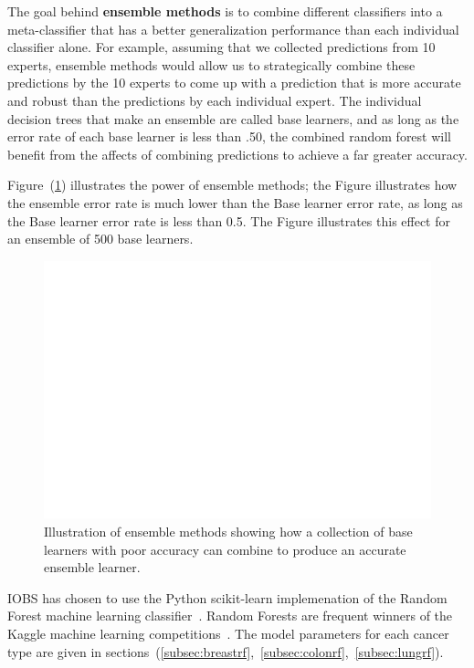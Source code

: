 \documentclass[a4paper,11pt]{article}
\begin{document}
The goal behind \textbf{ensemble methods} is to combine different classifiers into a meta-classifier that has a better generalization performance than each individual classifier alone. For example, assuming that we collected predictions from 10 experts, ensemble methods would allow us to strategically combine these predictions by the 10 experts to come up with a prediction that is more accurate and robust than the predictions by each individual expert. The individual decision trees that make an ensemble are called base learners, and as long as the error rate of each base learner is less than .50, the combined random forest will benefit from the affects of combining predictions to achieve a far greater accuracy.



Figure~(\ref{fig:ensemble}) illustrates the power of ensemble methods; the Figure illustrates how the ensemble error rate is much lower than the Base learner error rate, as long as the Base learner error rate is less than 0.5. The Figure illustrates this effect for an ensemble of 500 base learners.



\begin{figure}[!ht]
  \centering
    \includegraphics[scale=.75]{ensemble}
\caption{\label{fig:ensemble} Illustration of ensemble methods showing how a collection of base learners with poor accuracy can combine to produce an accurate ensemble learner.}
\end{figure}


IOBS has chosen to use the Python scikit-learn implemenation of the Random Forest machine 
learning classifier~\cite{rf}.
Random Forests are frequent winners of the Kaggle machine learning competitions~\cite{kagglerf}.
The model parameters for each cancer type are given in sections~(\ref{subsec:breastrf},~\ref{subsec:colonrf},~\ref{subsec:lungrf}).
\end{document}
